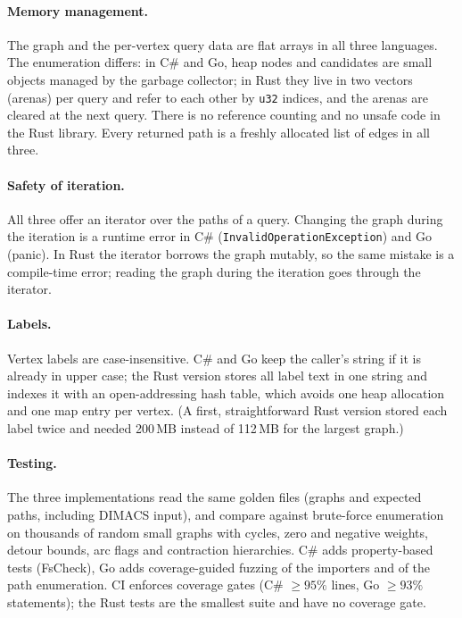 \documentclass[11pt,a4paper]{article}
\newcommand{\cs}{C\#}
\begin{document}
\paragraph{Memory management.} The graph and the per-vertex query data are flat arrays in all three languages. The
enumeration differs: in \cs{} and Go, heap nodes and candidates are small objects managed by the garbage collector;
in Rust they live in two vectors (arenas) per query and refer to each other by \texttt{u32} indices, and the arenas
are cleared at the next query. There is no reference counting and no unsafe code in the Rust library. Every returned
path is a freshly allocated list of edges in all three.

\paragraph{Safety of iteration.} All three offer an iterator over the paths of a query. Changing the graph during the
iteration is a runtime error in \cs{} (\texttt{InvalidOperationException}) and Go (panic). In Rust the iterator
borrows the graph mutably, so the same mistake is a compile-time error; reading the graph during the iteration goes
through the iterator.

\paragraph{Labels.} Vertex labels are case-insensitive. \cs{} and Go keep the caller's string if it is already in
upper case; the Rust version stores all label text in one string and indexes it with an open-addressing hash table,
which avoids one heap allocation and one map entry per vertex. (A first, straightforward Rust version stored each
label twice and needed 200\,MB instead of 112\,MB for the largest graph.)

\paragraph{Testing.} The three implementations read the same golden files (graphs and expected paths, including
DIMACS input), and compare against brute-force enumeration on thousands of random small graphs with cycles, zero
and negative weights, detour bounds, arc flags and contraction hierarchies. \cs{} adds property-based tests
(FsCheck), Go adds coverage-guided fuzzing of the importers and of the path enumeration. CI enforces coverage gates
(\cs{} $\ge 95\%$ lines, Go $\ge 93\%$ statements); the Rust tests are the smallest suite and have no coverage gate.
\end{document}
